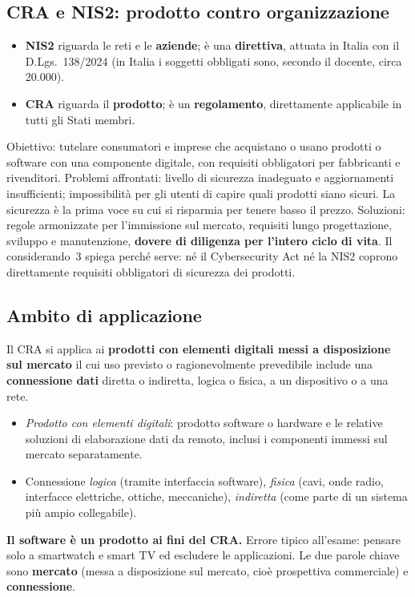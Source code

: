 \subsection{CRA e NIS2: prodotto contro organizzazione}
\begin{itemize}
  \item \textbf{NIS2} riguarda le reti e le \textbf{aziende}; è una \textbf{direttiva}, attuata in Italia con
    il D.Lgs.~138/2024 (in Italia i soggetti obbligati sono, secondo il docente, circa 20.000).
  \item \textbf{CRA} riguarda il \textbf{prodotto}; è un \textbf{regolamento}, direttamente applicabile in
    tutti gli Stati membri.
\end{itemize}
Obiettivo: tutelare consumatori e imprese che acquistano o usano prodotti o software con una componente
digitale, con requisiti obbligatori per fabbricanti e rivenditori. Problemi affrontati: livello di
sicurezza inadeguato e aggiornamenti insufficienti; impossibilità per gli utenti di capire quali prodotti
siano sicuri. La sicurezza è la prima voce su cui si risparmia per tenere basso il prezzo. Soluzioni:
regole armonizzate per l'immissione sul mercato, requisiti lungo progettazione, sviluppo e manutenzione,
\textbf{dovere di diligenza per l'intero ciclo di vita}. Il considerando~3 spiega perché serve: né il
Cybersecurity Act né la NIS2 coprono direttamente requisiti obbligatori di sicurezza dei prodotti.

\subsection{Ambito di applicazione}
Il CRA si applica ai \textbf{prodotti con elementi digitali messi a disposizione sul mercato} il cui uso
previsto o ragionevolmente prevedibile include una \textbf{connessione dati} diretta o indiretta, logica o
fisica, a un dispositivo o a una rete.
\begin{itemize}
  \item \emph{Prodotto con elementi digitali}: prodotto software o hardware e le relative soluzioni di
    elaborazione dati da remoto, inclusi i componenti immessi sul mercato separatamente.
  \item Connessione \emph{logica} (tramite interfaccia software), \emph{fisica} (cavi, onde radio,
    interfacce elettriche, ottiche, meccaniche), \emph{indiretta} (come parte di un sistema più ampio
    collegabile).
\end{itemize}

\begin{esame}
\textbf{Il software è un prodotto ai fini del CRA.} Errore tipico all'esame: pensare solo a smartwatch e
smart TV ed escludere le applicazioni. Le due parole chiave sono \textbf{mercato} (messa a disposizione
sul mercato, cioè prospettiva commerciale) e \textbf{connessione}.
\end{esame}

